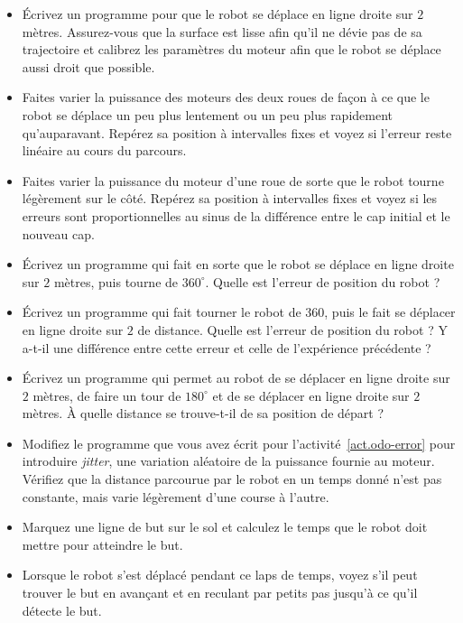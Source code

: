 \begin{framed}
\begin{itemize}
\item Écrivez un programme pour que le robot se déplace en ligne droite sur $2$ mètres. Assurez-vous que la surface est lisse afin qu'il ne dévie pas de sa trajectoire et calibrez les paramètres du moteur afin que le robot se déplace aussi droit que possible.
\item Faites varier la puissance des moteurs des deux roues de façon à ce que le robot se déplace un peu plus lentement ou un peu plus rapidement qu'auparavant. Repérez sa position à intervalles fixes et voyez si l'erreur reste linéaire au cours du parcours.
\item Faites varier la puissance du moteur d'une roue de sorte que le robot tourne légèrement sur le côté. Repérez sa position à intervalles fixes et voyez si les erreurs sont proportionnelles au sinus de la différence entre le cap initial et le nouveau cap.
\end{itemize}
\end{framed}

\begin{framed}
\begin{itemize}
\item Écrivez un programme qui fait en sorte que le robot se déplace en ligne droite sur $2$ mètres, puis tourne de $360^\circ$. Quelle est l'erreur de position du robot ?
\item Écrivez un programme qui fait tourner le robot de $360$, puis le fait se déplacer en ligne droite sur $2$ de distance. Quelle est l'erreur de position du robot ? Y a-t-il une différence entre cette erreur et celle de l'expérience précédente ?
\item Écrivez un programme qui permet au robot de se déplacer en ligne droite sur $2$ mètres, de faire un tour de $180^\circ$ et de se déplacer en ligne droite sur $2$ mètres. À quelle distance se trouve-t-il de sa position de départ ?
\end{itemize}
\end{framed}

\begin{framed}
\begin{itemize}
\item Modifiez le programme que vous avez écrit pour l'activité~\ref{act.odo-error} pour introduire \emph{jitter}, une variation aléatoire de la puissance fournie au moteur. Vérifiez que la distance parcourue par le robot en un temps donné n'est pas constante, mais varie légèrement d'une course à l'autre.
\item Marquez une ligne de but sur le sol et calculez le temps que le robot doit mettre pour atteindre le but.
\item Lorsque le robot s'est déplacé pendant ce laps de temps, voyez s'il peut trouver le but en avançant et en reculant par petits pas jusqu'à ce qu'il détecte le but.
\end{itemize}
\end{framed}

